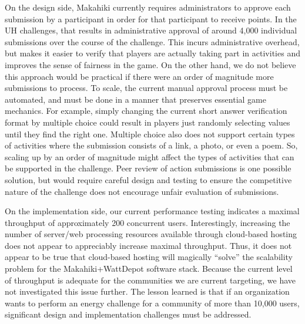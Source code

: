 On the design side, Makahiki currently requires administrators to approve each submission by a participant in order for that participant to receive points.   In the UH challenges, that results in administrative approval of around 4,000 individual submissions over the course of the challenge.  This incurs administrative overhead, but makes it easier to verify that players are actually taking part in activities and improves the sense of fairness in the game.  On the other hand, we do not believe this approach would be practical if there were an order of magnitude more submissions to process.  To scale, the current manual approval process must be automated, and must be done in a manner that preserves essential game mechanics.  For example, simply changing the current short answer verification format by multiple choice could result in players just randomly selecting values until they find the right one.  Multiple choice also does not support certain types of activities where the submission consists of a link, a photo, or even a poem.  So, scaling up by an order of magnitude might affect the types of activities that can be supported in the challenge. Peer review of action submissions is one possible solution, but would require careful design and testing to ensure the competitive nature of the challenge does not encourage unfair evaluation of submissions.

On the implementation side, our current performance testing indicates a maximal throughput of approximately 200 concurrent users.  Interestingly, increasing the number of server/web processing resources available through cloud-based hosting does not appear to appreciably increase maximal throughput.  Thus, it does not appear to be true that cloud-based hosting will magically ``solve'' the scalability problem for the Makahiki+WattDepot software stack.  Because the current level of throughput is adequate for the communities we are current targeting, we have not investigated this issue further.  The lesson learned is that if an organization wants to perform an energy challenge for a community of more than 10,000 users, significant design and implementation challenges must be addressed.
